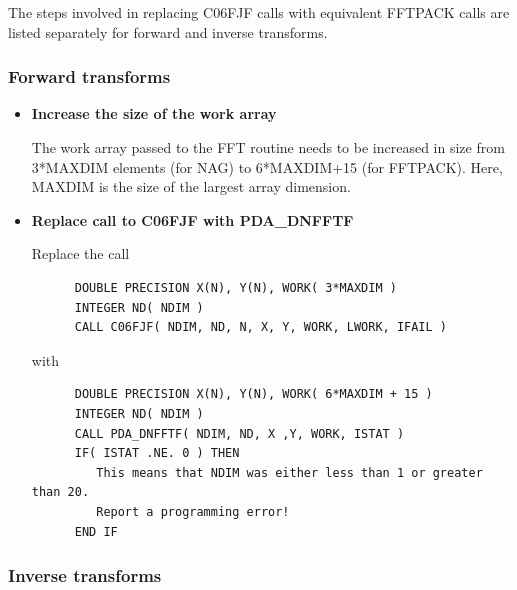 \documentclass[11pt,twoside]{article}
\newcommand{\htmlref}[2]{#1}
\newcommand{\xlabel}[1]{}
\begin{document}
   The steps involved in replacing C06FJF calls with
   equivalent FFTPACK calls are listed separately for forward and
   inverse transforms.


\subsubsection{\xlabel{forward_transforms}Forward transforms}

\begin{itemize}

\item{\bf Increase the size of the work array}

   The work array passed to the FFT routine needs to be increased in
   size from 3*MAXDIM elements (for NAG) to 6*MAXDIM+15 (for FFTPACK).
   Here, MAXDIM is the size of the largest array dimension.

\item{\bf Replace call to C06FJF with
\htmlref{PDA\_DNFFTF}{PDA\_NFFTF}}

   Replace the call

\begin{verbatim}
      DOUBLE PRECISION X(N), Y(N), WORK( 3*MAXDIM )
      INTEGER ND( NDIM )
      CALL C06FJF( NDIM, ND, N, X, Y, WORK, LWORK, IFAIL )
\end{verbatim}

   with

\begin{verbatim}
      DOUBLE PRECISION X(N), Y(N), WORK( 6*MAXDIM + 15 )
      INTEGER ND( NDIM )
      CALL PDA_DNFFTF( NDIM, ND, X ,Y, WORK, ISTAT )
      IF( ISTAT .NE. 0 ) THEN
         This means that NDIM was either less than 1 or greater than 20.
         Report a programming error!
      END IF
\end{verbatim}

\end{itemize}


\subsubsection{\xlabel{inverse_transforms}Inverse transforms}
\end{document}
